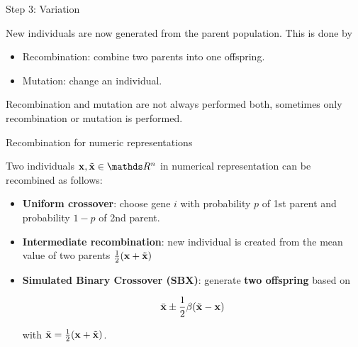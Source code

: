 \begin{frame}{Step 3: Variation}

New individuals are now generated from the parent population. This is done by

\begin{itemize}
\item Recombination: combine two parents into one offspring.
\item Mutation: change an individual.
\end{itemize}

Recombination and mutation are not always performed both, sometimes only recombination or mutation is performed.

\end{frame}

\begin{frame}{Recombination for numeric representations}

Two individuals $\x, \tilde\x \in \R^n$ in numerical representation can be recombined as follows:

\begin{itemize}
\item \textbf{Uniform crossover}: choose gene $i$ with probability $p$ of 1st parent and probability $1-p$ of 2nd parent.
\item \textbf{Intermediate recombination}: new individual is created from the mean value of two parents $\frac{1}{2}(\mathbf{x} + \tilde{\mathbf{x}})$
\item \textbf{Simulated Binary Crossover (SBX)}: generate \textbf{two offspring} based on

$$
\bar{\mathbf{x}} \pm \frac{1}{2} \beta (\tilde{\mathbf{x}} - \mathbf{x})
$$

with $\bar{\mathbf{x}} = \frac{1}{2} (\mathbf{x} + \tilde{\mathbf{x}})$.
\end{itemize}

\end{frame}


